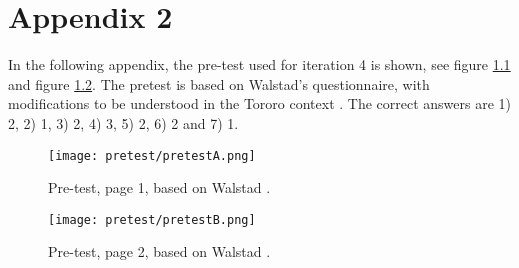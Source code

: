 \chapter{Appendix 2}\label{cha:pre-test}

In the following appendix, the pre-test used for iteration 4 is shown, see figure \ref{fig:pretest1} and figure \ref{fig:pretest2}. The pretest is based on Walstad's questionnaire, with modifications to be understood in the Tororo context \cite{general-entrepreneurship-quiz}. The correct answers are 1) 2, 2) 1, 3) 2, 4) 3, 5) 2, 6) 2 and 7) 1.

\begin{figure}[h]
    \centering
    \texttt{[image: pretest/pretestA.png]}
    \caption{Pre-test, page 1, based on Walstad \cite{general-entrepreneurship-quiz}.}
    \label{fig:pretest1}
\end{figure}

\begin{figure}[h]
    \centering
    \texttt{[image: pretest/pretestB.png]}
    \caption{Pre-test, page 2, based on Walstad \cite{general-entrepreneurship-quiz}.}
    \label{fig:pretest2}
\end{figure}
